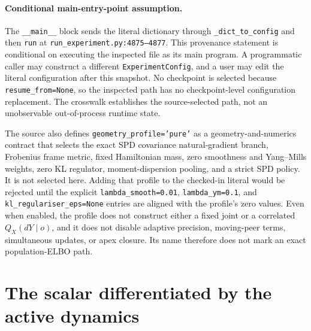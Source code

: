 \paragraph{Conditional main-entry-point assumption.}
The \texttt{\_\_main\_\_} block sends the literal dictionary through \texttt{\_dict\_to\_config} and then \texttt{run} at \texttt{run\_experiment.py:4875--4877}. This provenance statement is conditional on executing the inspected file as its main program. A programmatic caller may construct a different \texttt{ExperimentConfig}, and a user may edit the literal configuration after this snapshot. No checkpoint is selected because \texttt{resume\_from=None}, so the inspected path has no checkpoint-level configuration replacement. The crosswalk establishes the source-selected path, not an unobservable out-of-process runtime state.

The source also defines \texttt{geometry\_profile='pure'} as a geometry-and-numerics contract that selects the exact SPD covariance natural-gradient branch, Frobenius frame metric, fixed Hamiltonian mass, zero smoothness and Yang--Mills weights, zero KL regulator, moment-dispersion pooling, and a strict SPD policy. It is not selected here. Adding that profile to the checked-in literal would be rejected until the explicit \texttt{lambda\_smooth=0.01}, \texttt{lambda\_ym=0.1}, and \texttt{kl\_regulariser\_eps=None} entries are aligned with the profile's zero values. Even when enabled, the profile does not construct either a fixed joint or a correlated \(Q_X(dY\mid o)\), and it does not disable adaptive precision, moving-peer terms, simultaneous updates, or apex closure. Its name therefore does not mark an exact population-ELBO path.

\section{The scalar differentiated by the active dynamics}


